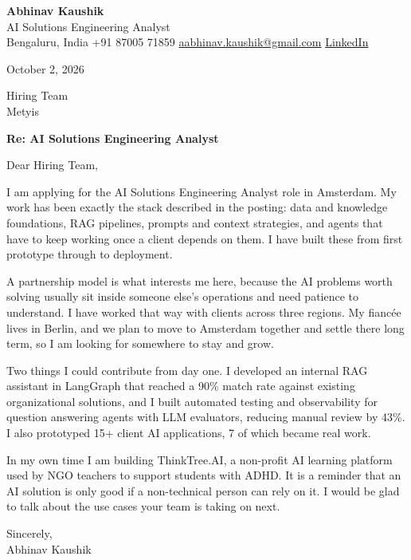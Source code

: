\documentclass[11pt,a4paper]{article}
\begin{document}
{\Large\bfseries Abhinav Kaushik}\\
AI Solutions Engineering Analyst\\
Bengaluru, India \textbar{} +91 87005 71859 \textbar{} \href{mailto:aabhinav.kaushik@gmail.com}{aabhinav.kaushik@gmail.com} \textbar{} \href{https://www.linkedin.com/in/abhinav-kaushik10/}{LinkedIn}  

October 2, 2026

Hiring Team\\
Metyis

\textbf{Re: AI Solutions Engineering Analyst}

Dear Hiring Team,

I am applying for the AI Solutions Engineering Analyst role in Amsterdam. My work has been exactly the stack described in the posting: data and knowledge foundations, RAG pipelines, prompts and context strategies, and agents that have to keep working once a client depends on them. I have built these from first prototype through to deployment.

A partnership model is what interests me here, because the AI problems worth solving usually sit inside someone else's operations and need patience to understand. I have worked that way with clients across three regions. My fiancée lives in Berlin, and we plan to move to Amsterdam together and settle there long term, so I am looking for somewhere to stay and grow.

Two things I could contribute from day one. I developed an internal RAG assistant in LangGraph that reached a 90\% match rate against existing organizational solutions, and I built automated testing and observability for question answering agents with LLM evaluators, reducing manual review by 43\%. I also prototyped 15+ client AI applications, 7 of which became real work.

In my own time I am building ThinkTree.AI, a non-profit AI learning platform used by NGO teachers to support students with ADHD. It is a reminder that an AI solution is only good if a non-technical person can rely on it. I would be glad to talk about the use cases your team is taking on next.

Sincerely,\\[4pt]
Abhinav Kaushik
\end{document}
